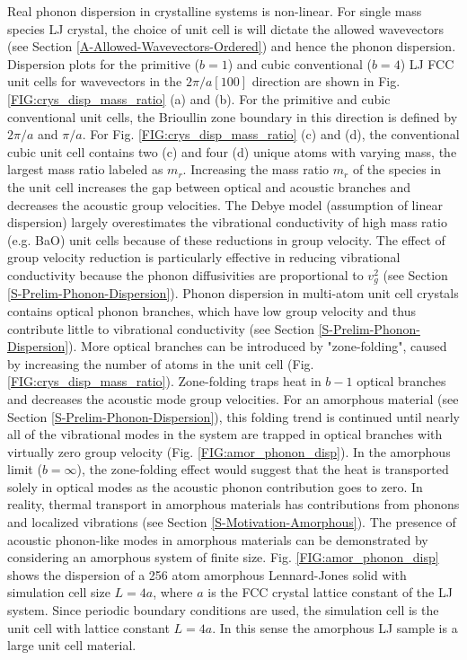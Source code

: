 \documentclass[letterpaper,12pt]{article}
\begin{document}
Real phonon dispersion in crystalline systems is non-linear. For single mass species LJ crystal, the choice of unit cell is will dictate the allowed wavevectors (see Section \ref{A-Allowed-Wavevectors-Ordered}) and hence the phonon dispersion. Dispersion plots for the primitive ($b=1$) and cubic conventional ($b=4$) LJ FCC unit cells for wavevectors in the $2\pi/a[100]$ direction are shown in Fig. \ref{FIG:crys_disp_mass_ratio} (a) and (b). For the primitive and cubic conventional unit cells, the Brioullin zone boundary in this direction is defined by $2\pi/a$ and $\pi/a$. For Fig. \ref{FIG:crys_disp_mass_ratio} (c) and (d), the conventional cubic unit cell contains two (c) and four (d) unique atoms with varying mass, the largest mass ratio labeled as $m_r$. Increasing the mass ratio $m_r$ of the species in the unit cell increases the gap between optical and acoustic branches and decreases the acoustic group velocities. The Debye model (assumption of linear dispersion) largely overestimates the vibrational conductivity of high mass ratio (e.g. BaO) unit cells because of these reductions in group velocity.\cite{Toberer2011} The effect of group velocity reduction is particularly effective in reducing vibrational conductivity because the phonon diffusivities are proportional to $v^2_g$ (see Section \ref{S-Prelim-Phonon-Dispersion}).
Phonon dispersion in multi-atom unit cell crystals contains optical phonon branches, which have low group velocity and thus contribute little to vibrational conductivity (see Section \ref{S-Prelim-Phonon-Dispersion}). More optical branches can be introduced by "zone-folding", caused by increasing the number of atoms in the unit cell (Fig. \ref{FIG:crys_disp_mass_ratio}). Zone-folding traps heat in $b-1$ optical branches and decreases the acoustic mode group velocities.\cite{PhysRev.141.767} 
For an amorphous material (see Section \ref{S-Prelim-Phonon-Dispersion}), this folding trend is continued until nearly all of the vibrational modes in the system are trapped in optical branches with virtually zero group velocity (Fig. \ref{FIG:amor_phonon_disp}). 
In the amorphous limit ($b=\infty$), the zone-folding effect would suggest that the heat is transported solely in optical modes as the acoustic phonon contribution goes to zero. In reality, thermal transport in amorphous materials has contributions from phonons and localized vibrations (see Section \ref{S-Motivation-Amorphous}). The presence of acoustic phonon-like modes in amorphous materials can be demonstrated by considering an amorphous system of finite size. Fig. \ref{FIG:amor_phonon_disp} shows the dispersion of a 256 atom amorphous Lennard-Jones solid with simulation cell size $L=4a$, where $a$ is the FCC crystal lattice constant of the LJ system. Since periodic boundary conditions are used, the simulation cell is the unit cell with lattice constant $L=4a$. In this sense the amorphous LJ sample is a large unit cell material. 
\end{document}
